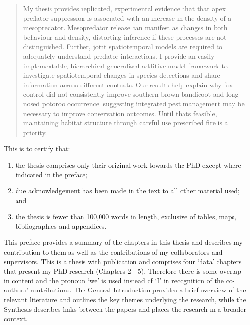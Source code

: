 \documentclass[11pt,a4paper,titlepage,twoside,openright]{style/unimelbthesis}
\begin{document}
\begin{frontmatter}
\begin{abstract}
    My thesis provides replicated, experimental evidence that that apex predator suppression is associated with an increase in the density of a mesopredator. Mesopredator release can manifest as changes in both behaviour and density, distorting inference if these processes are not distinguished. Further, joint spatiotemporal models are required to adequately understand predator interactions. I provide an easily implementable, hierarchical generalised additive model framework to investigate spatiotemporal changes in species detections and share information across different contexts. Our results help explain why fox control did not consistently improve southern brown bandicoot and long-nosed potoroo occurrence, suggesting integrated pest management may be necessary to improve conservation outcomes. Until thats feasible, maintaining habitat structure through careful use prescribed fire is a priority.
  \end{abstract}
  \begin{declaration}
    This is to certify that:
    \begin{enumerate}
    \def\labelenumi{\roman{enumi}.}
    \tightlist
    \item
      the thesis comprises only their original work towards the PhD except where indicated in the preface;
    \item
      due acknowledgement has been made in the text to all other material
      used; and
    \item
      the thesis is fewer than 100,000 words in length, exclusive of
      tables, maps, bibliographies and appendices.
    \end{enumerate}
  \end{declaration}
  \begin{preface}
    This preface provides a summary of the chapters in this thesis and describes my contribution to them as well as the contributions of my collaborators and supervisors. This is a thesis with publication and comprises four `data' chapters that present my PhD research (Chapters 2 - 5). Therefore there is some overlap in content and the pronoun `we' is used instead of `I' in recognition of the co-authors' contributions. The General Introduction provides a brief overview of the relevant literature and outlines the key themes underlying the research, while the Synthesis describes links between the papers and places the research in a broader context.
    

\end{preface}
\end{frontmatter}
\end{document}
